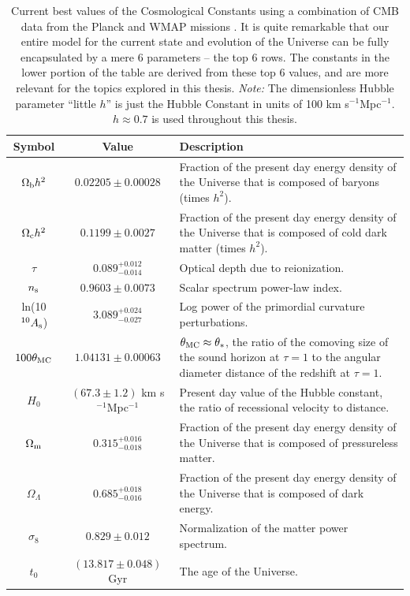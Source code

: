 \begin{table}%
 \begin{center}
    \begin{tabular}{|c|c|p{10cm}|}

      \hline
      Symbol & Value & Description \\ \hline \hline

      $\Omega_{\rm b}h^2$ & $0.02205\pm0.00028$ & Fraction of the present day energy density of the Universe that is composed of baryons (times $h^2$). \\ \hline
      $\Omega_{\rm c}h^2$ & $0.1199\pm0.0027$ & Fraction of the present day energy density of the Universe that is composed of cold dark matter (times $h^2$). \\ \hline
      $\tau$ & $0.089^{+0.012}_{-0.014}$ & Optical depth due to reionization. \\ \hline
      $n_{\rm s}$ & $0.9603\pm0.0073$ & Scalar spectrum power-law index. \\ \hline
      ln(10$^{10}A_{\rm s}$) & $3.089^{+0.024}_{-0.027}$ & Log power of the primordial curvature perturbations. \\ \hline 
      $100\theta_{\rm MC}$ & $1.04131\pm0.00063$ & $\theta_{\rm MC} \approx \theta_*$, the ratio of the comoving size of the sound horizon at $\tau=1$ to the angular diameter distance of the redshift at $\tau=1$. \\ \hline \hline

      $H_0$ & $(67.3\pm1.2)$ km s$^{-1}$Mpc$^{-1}$ & Present day value of the Hubble constant, the ratio of recessional velocity to distance. \\ \hline
      $\Omega_{\rm m}$ & $0.315^{+0.016}_{-0.018}$ & Fraction of the present day energy density of the Universe that is composed of pressureless matter. \\ \hline
      $\Omega_{\Lambda}$ & $0.685^{+0.018}_{-0.016}$ & Fraction of the present day energy density of the Universe that is composed of dark energy. \\ \hline
      $\sigma_8$ & $0.829\pm0.012$ & Normalization of the matter power spectrum. \\ \hline
      $t_0$ & $(13.817\pm0.048)$ Gyr & The age of the Universe. \\ \hline

    \end{tabular}
  \caption[Cosmological Constants]{Current best values of the Cosmological Constants using a combination of \ac{CMB} data from the \acs{Planck} and \ac{WMAP} missions \citep{PlanckXVI}. It is quite remarkable that our entire model for the current state and evolution of the Universe can be fully encapsulated by a mere 6 parameters -- the top 6 rows. The constants in the lower portion of the table are derived from these top 6 values, and are more relevant for the topics explored in this thesis. {\it Note: }The dimensionless Hubble parameter ``little $h$'' is just the Hubble Constant in units of 100 km s$^{-1}$Mpc$^{-1}$. $h \approx 0.7$ is used throughout this thesis.}
  \label{table:constants}

 \end{center}
\end{table}



